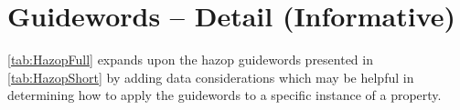 %
%
\chapter{ Guidewords -- Detail (Informative)} \label{bkm:guidewords}


\autoref{tab:HazopFull}
expands upon the \gls{hazop} guidewords presented in \autoref{tab:HazopShort} by adding data considerations which may be helpful in determining how to apply the guidewords to a specific instance of a property.

